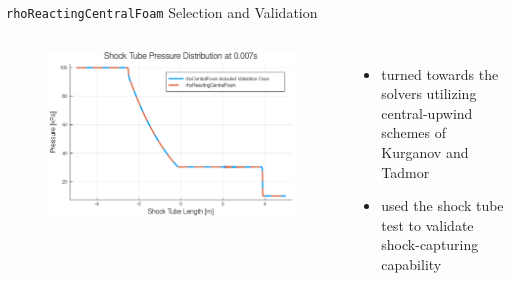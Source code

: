 \begin{frame}{\texttt{rhoReactingCentralFoam} Selection and Validation}
\begin{columns}
\begin{figure}[]
\centering
\includegraphics[width=\linewidth]{../figs/shocktube.png} 
\end{figure}%

\begin{itemize}
\item turned towards the solvers utilizing central-upwind schemes of Kurganov and Tadmor \cite{kurganov1}
\item used the shock tube test to validate shock-capturing capability
\end{itemize}
\end{columns}
\end{frame}
